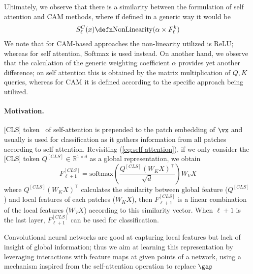 Ultimately, we observe that there is a similarity between the formulation of self attention and CAM methods, where if defined in a generic way it would be 
\begin{equation}
    S_\ell^C(x) \defn \mbox{NonLinearity}(\alpha\times F^k_\ell)
    \label{eq:CamIsAtt}
\end{equation}
We note that for CAM-based approaches the non-linearity utilized is ReLU; whereas for self attention, Softmax is used instead. On another hand, we observe that the calculation of the generic weighting coefficient $\alpha$ provides yet another difference; on self attention this is obtained by the matrix multiplication of $Q, K$ queries, whereas for CAM it is defined according to the specific approach being utilized.

\paragraph{Motivation.} 
[CLS] token~\citep{DBLP:journals/corr/abs-1810-04805,DBLP:journals/corr/abs-2010-11929} of self-attention is prepended to the patch embedding of $\vx$ and usually is used for classification as it gathers information from all patches according to self-attention. 
Revisiting (\ref{eq:self-attention}), if we only consider the [CLS] token $Q^{[CLS]} \in \mathbb{R}^{1\times d}$ as a global representation, we obtain
\begin{equation}
     F_{\ell+1}^{[CLS]} = \mbox{softmax}(\frac{Q^{[CLS]} (W_KX)^{\top}}{\sqrt{d}})W_VX
\end{equation}
where $Q^{[CLS]}(W_KX)^{\top}$ calculates the similarity between global feature ($Q^{[CLS]}$) and local features of each patches ($W_KX$), then $F_{\ell+1}^{[CLS]}$ is a linear combination of the local features ($W_VX$) according to this similarity vector. When $\ell + 1$ is the last layer, $F_{\ell+1}^{[CLS]}$ can be used for classification.

Convolutional neural networks are good at capturing local features but lack of insight of global information; thus we aim at learning this representation by leveraging interactions with feature maps at given points of a network, using a mechanism inspired from the self-attention operation to replace $\gap$
   

